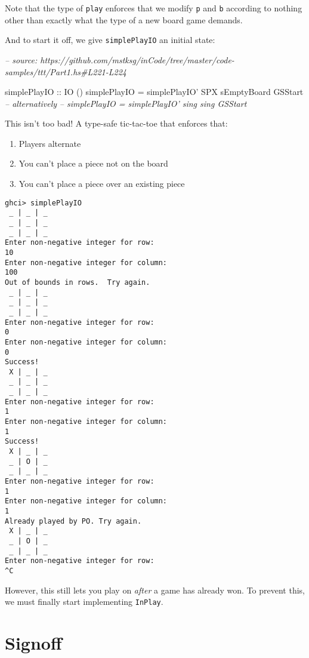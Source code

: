 \documentclass[]{article}
\newenvironment{Shaded}{}{}
\newcommand{\CommentTok}[1]{\textcolor[rgb]{0.38,0.63,0.69}{\textit{#1}}}
\newcommand{\DataTypeTok}[1]{\textcolor[rgb]{0.56,0.13,0.00}{#1}}
\newcommand{\FunctionTok}[1]{\textcolor[rgb]{0.02,0.16,0.49}{#1}}
\newcommand{\NormalTok}[1]{#1}
\newcommand{\OtherTok}[1]{\textcolor[rgb]{0.00,0.44,0.13}{#1}}
\begin{document}
Note that the type of \texttt{play} enforces that we modify \texttt{p} and
\texttt{b} according to nothing other than exactly what the type of a new board
game demands.

And to start it off, we give \texttt{simplePlayIO\textquotesingle{}} an initial
state:

\begin{Shaded}
\begin{Highlighting}[]
\CommentTok{-- source: https://github.com/mstksg/inCode/tree/master/code-samples/ttt/Part1.hs#L221-L224}

\OtherTok{simplePlayIO ::} \DataTypeTok{IO}\NormalTok{ ()}
\NormalTok{simplePlayIO }\FunctionTok{=}\NormalTok{ simplePlayIO' }\DataTypeTok{SPX}\NormalTok{ sEmptyBoard }\DataTypeTok{GSStart}
\CommentTok{-- alternatively}
\CommentTok{-- simplePlayIO = simplePlayIO' sing sing GSStart}
\end{Highlighting}
\end{Shaded}

This isn't too bad! A type-safe tic-tac-toe that enforces that:

\begin{enumerate}
\def\labelenumi{\arabic{enumi}.}
\tightlist
\item
  Players alternate
\item
  You can't place a piece not on the board
\item
  You can't place a piece over an existing piece
\end{enumerate}

\begin{verbatim}
ghci> simplePlayIO
 _ | _ | _
 _ | _ | _
 _ | _ | _
Enter non-negative integer for row:
10
Enter non-negative integer for column:
100
Out of bounds in rows.  Try again.
 _ | _ | _
 _ | _ | _
 _ | _ | _
Enter non-negative integer for row:
0
Enter non-negative integer for column:
0
Success!
 X | _ | _
 _ | _ | _
 _ | _ | _
Enter non-negative integer for row:
1
Enter non-negative integer for column:
1
Success!
 X | _ | _
 _ | O | _
 _ | _ | _
Enter non-negative integer for row:
1
Enter non-negative integer for column:
1
Already played by PO. Try again.
 X | _ | _
 _ | O | _
 _ | _ | _
Enter non-negative integer for row:
^C
\end{verbatim}

However, this still lets you play on \emph{after} a game has already won. To
prevent this, we must finally start implementing \texttt{InPlay}.

\hypertarget{signoff}{%
\section{Signoff}\label{signoff}}
\end{document}
